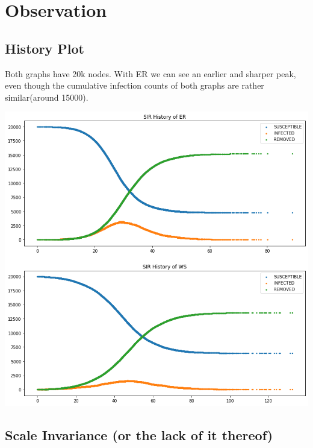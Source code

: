 \documentclass[12pt]{article}
\theoremstyle{definition}
\begin{document}
\section{Observation}
\subsection{History Plot}
Both graphs have 20k nodes. With ER we can see an earlier and sharper peak, even though the cumulative infection counts of both graphs are rather similar(around 15000). 
\begin{center}
    \includegraphics[scale=0.6]{images/ER_WS.png}
\end{center}
\newpage

\subsection{Scale Invariance (or the lack of it thereof)}
\end{document}
